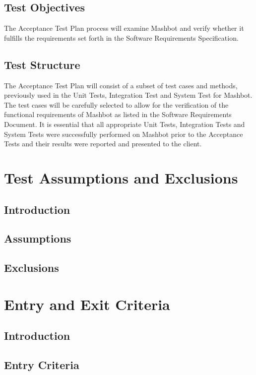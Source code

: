 \documentclass{article}
\begin{document}
\subsection{Test Objectives}

The Acceptance Test Plan process will examine Mashbot and verify
whether it fulfills the requirements set forth in the Software
Requirements Specification.


\subsection{Test Structure}

The Acceptance Test Plan will consist of a subset of test cases and
methods, previously used in the Unit Tests, Integration Test and
System Test for Mashbot. The test cases will be carefully selected to
allow for the verification of the functional requirements of Mashbot
as listed in the Software Requirements Document. It is essential that
all appropriate Unit Tests, Integration Tests and System Tests were
successfully performed on Mashbot prior to the Acceptance Tests
and their results were reported and presented to the client.

\section{Test Assumptions and Exclusions} %

\subsection{Introduction}
\subsection{Assumptions}
\subsection{Exclusions}

\section{Entry and Exit Criteria} %

\subsection{Introduction}
\subsection{Entry Criteria}
\end{document}
